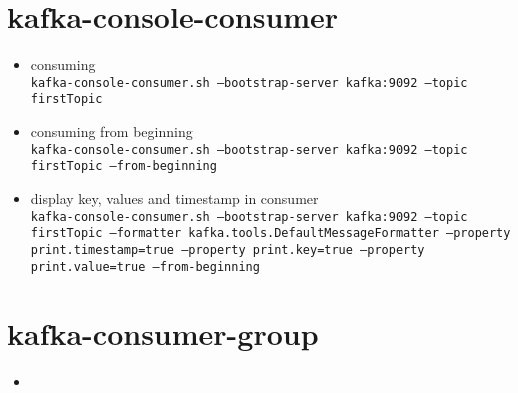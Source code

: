 \documentclass{article}
\begin{document}
\section{kafka-console-consumer}
\begin{itemize}
\item consuming\\
\texttt{kafka-console-consumer.sh --bootstrap-server kafka:9092 --topic firstTopic}
\item consuming from beginning\\
\texttt{kafka-console-consumer.sh --bootstrap-server kafka:9092 --topic firstTopic --from-beginning}
\item display key, values and timestamp in consumer\\
\texttt{kafka-console-consumer.sh --bootstrap-server kafka:9092 --topic firstTopic --formatter kafka.tools.DefaultMessageFormatter --property print.timestamp=true --property print.key=true --property print.value=true --from-beginning}
\end{itemize}

\section{kafka-consumer-group}
\begin{itemize}
\item
\end{itemize}
\end{document}
